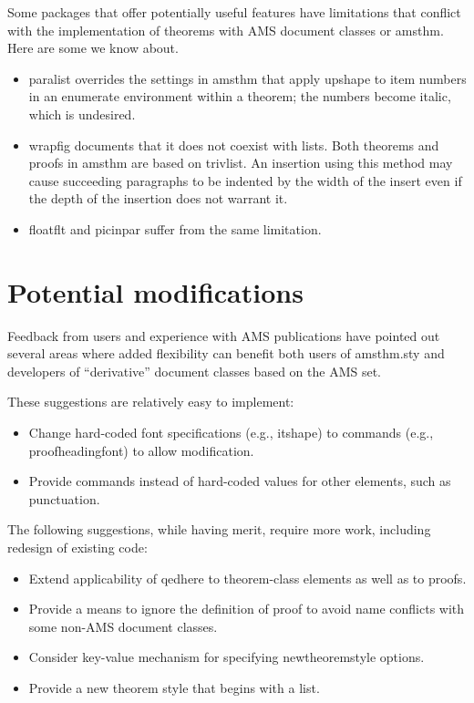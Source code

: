 \documentclass[11pt,twoside]{article}
\newcommand{\ntt}{%
  \fontfamily\ttdefault \fontseries\mddefault \fontshape\updefault
  \selectfont
}
\DeclareRobustCommand{\cn}[1]{{\ntt\bslchar#1}}
\DeclareRobustCommand{\pkg}[1]{{\ntt#1}}
\DeclareRobustCommand{\env}[1]{{\ntt#1}}
\begin{document}
Some packages that offer potentially useful features have limitations
that conflict with the implementation of theorems with AMS document
classes or \pkg{amsthm}.  Here are some we know about.
\begin{itemize}
\itemsep=.5\itemsep
\item \pkg{paralist} overrides the settings in \pkg{amsthm} that apply
  \cn{upshape} to item numbers in an \env{enumerate} environment within
  a theorem; the numbers become italic, which is undesired.
\item \pkg{wrapfig} documents that it does not coexist with lists.
  Both theorems and proofs in \pkg{amsthm} are based on \cn{trivlist}.
  An insertion using this method may cause succeeding paragraphs to be
  indented by the width of the insert even if the depth of the
  insertion does not warrant it.
\item \pkg{floatflt} and \pkg{picinpar} suffer from the same limitation.
\end{itemize}


\section{Potential modifications}

Feedback from users and experience with AMS publications have pointed
out several areas where added flexibility can benefit both users of
\pkg{amsthm.sty} and developers of ``derivative'' document classes
based on the AMS set.

These suggestions are relatively easy to implement:

\begin{itemize}
\item Change hard-coded font specifications (e.g., \cn{itshape})
  to commands (e.g., \cn{proofheadingfont}) to allow modification.
\item Provide commands instead of hard-coded values for other elements,
  such as punctuation.
\end{itemize}

The following suggestions, while having merit, require more work, including
redesign of existing code:

\begin{itemize}
\item Extend applicability of \cn{qedhere} to theorem-class elements
  as well as to proofs.
\item Provide a means to ignore the definition of \env{proof} to
  avoid name conflicts with some non-AMS document classes.
\item Consider key-value mechanism for specifying \cn{newtheoremstyle}
  options.
\item Provide a new theorem style that begins with a list.
\end{itemize}
\end{document}
